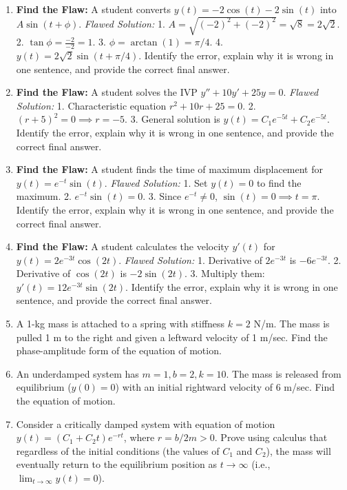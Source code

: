 \documentclass[11pt]{article}
\begin{document}
\begin{enumerate}[label=\textbf{\arabic*.}]
    \item \textbf{Find the Flaw:} A student converts $y(t) = -2\cos(t) - 2\sin(t)$ into $A\sin(t + \phi)$. 
    \textit{Flawed Solution:} 1. $A = \sqrt{(-2)^2 + (-2)^2} = \sqrt{8} = 2\sqrt{2}$. 2. $\tan \phi = \frac{-2}{-2} = 1$. 3. $\phi = \arctan(1) = \pi/4$. 4. $y(t) = 2\sqrt{2}\sin(t + \pi/4)$.
    Identify the error, explain why it is wrong in one sentence, and provide the correct final answer.
    
    \item \textbf{Find the Flaw:} A student solves the IVP $y'' + 10y' + 25y = 0$. 
    \textit{Flawed Solution:} 1. Characteristic equation $r^2 + 10r + 25 = 0$. 2. $(r+5)^2 = 0 \implies r = -5$. 3. General solution is $y(t) = C_1 e^{-5t} + C_2 e^{-5t}$.
    Identify the error, explain why it is wrong in one sentence, and provide the correct final answer.
    
    \item \textbf{Find the Flaw:} A student finds the time of maximum displacement for $y(t) = e^{-t}\sin(t)$. 
    \textit{Flawed Solution:} 1. Set $y(t) = 0$ to find the maximum. 2. $e^{-t}\sin(t) = 0$. 3. Since $e^{-t} \neq 0$, $\sin(t) = 0 \implies t = \pi$.
    Identify the error, explain why it is wrong in one sentence, and provide the correct final answer.
    
    \item \textbf{Find the Flaw:} A student calculates the velocity $y'(t)$ for $y(t) = 2e^{-3t}\cos(2t)$. 
    \textit{Flawed Solution:} 1. Derivative of $2e^{-3t}$ is $-6e^{-3t}$. 2. Derivative of $\cos(2t)$ is $-2\sin(2t)$. 3. Multiply them: $y'(t) = 12e^{-3t}\sin(2t)$.
    Identify the error, explain why it is wrong in one sentence, and provide the correct final answer.
    
    \item A 1-kg mass is attached to a spring with stiffness $k = 2$ N/m. The mass is pulled 1 m to the right and given a leftward velocity of 1 m/sec. Find the phase-amplitude form of the equation of motion.
    \item An underdamped system has $m=1, b=2, k=10$. The mass is released from equilibrium ($y(0)=0$) with an initial rightward velocity of 6 m/sec. Find the equation of motion.
    \item Consider a critically damped system with equation of motion $y(t) = (C_1 + C_2 t)e^{-rt}$, where $r = b/2m > 0$. Prove using calculus that regardless of the initial conditions (the values of $C_1$ and $C_2$), the mass will eventually return to the equilibrium position as $t \to \infty$ (i.e., $\lim_{t \to \infty} y(t) = 0$).
\end{enumerate}
\end{document}
